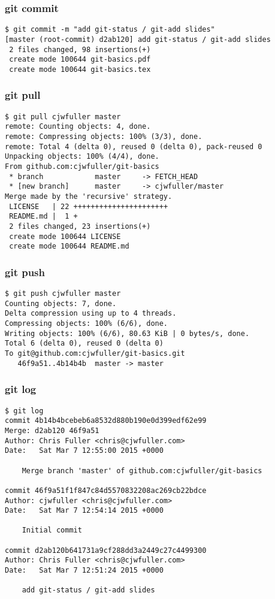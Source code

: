 \documentclass{beamer}
\begin{document}

\begin{frame}[fragile]
\frametitle{git commit}
	\scriptsize
	\begin{verbatim}
$ git commit -m "add git-status / git-add slides"
[master (root-commit) d2ab120] add git-status / git-add slides
 2 files changed, 98 insertions(+)
 create mode 100644 git-basics.pdf
 create mode 100644 git-basics.tex
	\end{verbatim}
\end{frame}


\begin{frame}[fragile]
\frametitle{git pull}
	\scriptsize
	\begin{verbatim}
$ git pull cjwfuller master
remote: Counting objects: 4, done.
remote: Compressing objects: 100% (3/3), done.
remote: Total 4 (delta 0), reused 0 (delta 0), pack-reused 0
Unpacking objects: 100% (4/4), done.
From github.com:cjwfuller/git-basics
 * branch            master     -> FETCH_HEAD
 * [new branch]      master     -> cjwfuller/master
Merge made by the 'recursive' strategy.
 LICENSE   | 22 ++++++++++++++++++++++
 README.md |  1 +
 2 files changed, 23 insertions(+)
 create mode 100644 LICENSE
 create mode 100644 README.md
	\end{verbatim}
\end{frame}


\begin{frame}[fragile]
\frametitle{git push}
	\scriptsize
	\begin{verbatim}
$ git push cjwfuller master
Counting objects: 7, done.
Delta compression using up to 4 threads.
Compressing objects: 100% (6/6), done.
Writing objects: 100% (6/6), 80.63 KiB | 0 bytes/s, done.
Total 6 (delta 0), reused 0 (delta 0)
To git@github.com:cjwfuller/git-basics.git
   46f9a51..4b14b4b  master -> master
	\end{verbatim}
\end{frame}


\begin{frame}[fragile]
\frametitle{git log}
	\scriptsize
	\begin{verbatim}
$ git log
commit 4b14b4bcebeb6a8532d880b190e0d399edf62e99
Merge: d2ab120 46f9a51
Author: Chris Fuller <chris@cjwfuller.com>
Date:   Sat Mar 7 12:55:00 2015 +0000

    Merge branch 'master' of github.com:cjwfuller/git-basics

commit 46f9a51f1f847c84d5570832208ac269cb22bdce
Author: cjwfuller <chris@cjwfuller.com>
Date:   Sat Mar 7 12:54:14 2015 +0000

    Initial commit

commit d2ab120b641731a9cf288dd3a2449c27c4499300
Author: Chris Fuller <chris@cjwfuller.com>
Date:   Sat Mar 7 12:51:24 2015 +0000

    add git-status / git-add slides
	\end{verbatim}
\end{frame}
\end{document}
